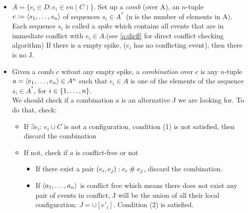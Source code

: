 \documentclass{llncs}
\begin{document}
\begin{itemize}
\item 
	$A = \{e_i \in D: e_i \in en(C)\}$.
	Set up a \emph{comb} (over A),
	an $n$-tuple $c \mathrel{:=} \langle s_1, \ldots, s_n\rangle$ of sequences $s_i \in A^*$
	(n is the number of elements in A).
	Each sequence $s_i$ is called a \emph{spike} 
	which contains all events that are in immediate conflict with $e_{i} \in A$.(see \cref{a:dicfl} for direct conflict checking algorithm)
	If there is a empty spike, ($e_i$ has no conflicting event), then there is no J.
\item
	Given a comb $c$ witout any empty spike, a \emph{combination} over $c$ is any $n$-tuple $a = \langle e_1, \ldots, e_n\rangle \in A^n$ such that $e_i \in A$ is one of the elements of the sequence $s_i \in A^*$, for $i \in {\{ 1, \ldots, n \mathclose \}}$. \\
	We should check if a combination $a$ is an alternative J we are looking for. To do that, check:
	
\begin{itemize}
	\item
		If $\exists e_i$: $e_i \cup C$ is not a configuration, condition (1) is not satisfied, 
		then discard the combination
	\item
		If not, check if $a$ is conflict-free or not
		\begin{itemize}
			\item
				If there exist a pair $(e_i, e_j): e_i \mathrel{\#} e_j$, discard the combination.
			\item
				If $\langle a_1, \ldots, a_n\rangle$ is conflict free which means there does not exist any pair 
				of events in conflict, J will be the union of all their local configuration:
				$ J = \cup [e'_i]$. Condition (2) is satisfied.
		\end{itemize}
\end{itemize}
\end{itemize}
\end{document}
